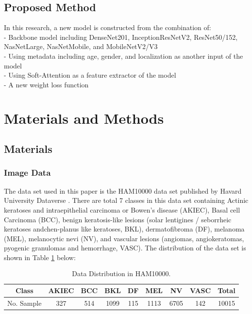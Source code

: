 \documentclass[sensors,article,submit,pdftex,moreauthors]{Definitions/mdpi}
\begin{document}
	\subsection{Proposed Method}
	In this research, a new model is constructed from the combination of:\\
	- Backbone model including DenseNet201, InceptionResNetV2, ResNet50/152, NasNetLarge, NasNetMobile, and MobileNetV2/V3\\
	- Using metadata including age, gender, and localization as another input of the model\\
	- Using Soft-Attention as a feature extractor of the model\\
	- A new weight loss function
	\section{Materials and Methods}
	\subsection{Materials}
	\subsubsection{Image Data}
	The data set used in this paper is the HAM10000 data set published by Havard University Dataverse \cite{10417}. There are total 7 classes in this data set containing Actinic keratoses and intraepithelial carcinoma or Bowen's disease (AKIEC), Basal cell Carcinoma (BCC),  benign keratosis-like lesions (solar lentigines / seborrheic keratoses andchen-planus like keratoses, BKL), dermatofibroma (DF), melanoma (MEL), melanocytic nevi (NV), and vascular lesions (angiomas, angiokeratomas, pyogenic granulomas and hemorrhage, VASC). The distribution of the data set is shown in Table \ref{table:data-distribution} below:
	
	\begin{table}[H]
		\centering
		\begin{tabular}{|c c c c c c c c c|} 
			\hline
			Class & AKIEC & BCC & BKL & DF & MEL & NV & VASC & Total \\ 
			\hline
			No. Sample & 327 & 514 & 1099 & 115 & 1113 & 6705 & 142 & 10015 \\
			\hline
		\end{tabular}
		\caption{Data Distribution in HAM10000.}
		\label{table:data-distribution}
	\end{table}
	
\end{document}
